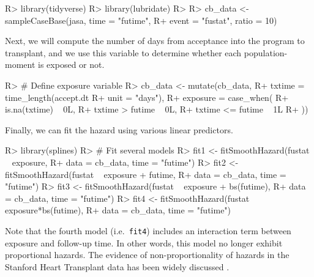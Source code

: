 \documentclass[
]{jss}
\begin{document}
\begin{CodeChunk}

\begin{CodeInput}
R> library(tidyverse)
R> library(lubridate)
R> 
R> cb_data <- sampleCaseBase(jasa, time = "futime", 
R+                           event = "fustat", ratio = 10)
\end{CodeInput}
\end{CodeChunk}

Next, we will compute the number of days from acceptance into the
program to transplant, and we use this variable to determine whether
each population-moment is exposed or not.

\begin{CodeChunk}

\begin{CodeInput}
R> # Define exposure variable
R> cb_data <- mutate(cb_data,
R+                   txtime = time_length(accept.dt %
R+                                        unit = "days"),
R+                   exposure = case_when(
R+                     is.na(txtime) ~ 0L,
R+                     txtime > futime ~ 0L,
R+                     txtime <= futime ~ 1L
R+                   ))
\end{CodeInput}
\end{CodeChunk}

Finally, we can fit the hazard using various linear predictors.

\begin{CodeChunk}

\begin{CodeInput}
R> library(splines)
R> # Fit several models
R> fit1 <- fitSmoothHazard(fustat ~ exposure,
R+                         data = cb_data, time = "futime")
R> fit2 <- fitSmoothHazard(fustat ~ exposure + futime,
R+                         data = cb_data, time = "futime")
R> fit3 <- fitSmoothHazard(fustat ~ exposure + bs(futime),
R+                         data = cb_data, time = "futime")
R> fit4 <- fitSmoothHazard(fustat ~ exposure*bs(futime),
R+                         data = cb_data, time = "futime")
\end{CodeInput}
\end{CodeChunk}

Note that the fourth model (i.e.~\texttt{fit4}) includes an interaction
term between exposure and follow-up time. In other words, this model no
longer exhibit proportional hazards. The evidence of non-proportionality
of hazards in the Stanford Heart Transplant data has been widely
discussed \citep{arjas1988graphical}.
\end{document}

